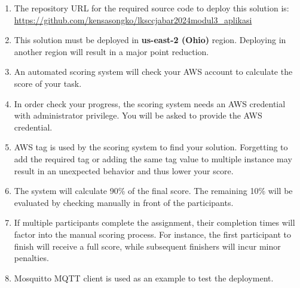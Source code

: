 \documentclass{article}
\begin{document}
\begin{enumerate}
  \item The repository URL for the required source code to deploy this solution is:\\
  \href{https://github.com/kensasongko/lksccjabar2024modul3_aplikasi}{https://github.com/kensasongko/lksccjabar2024modul3\_aplikasi}
  \item This solution must be deployed in \textbf{us-east-2 (Ohio)} region. Deploying in another region will result in a major point reduction.
  \item An automated scoring system will check your AWS account to calculate the score of your task.
  \item In order check your progress, the scoring system needs an AWS credential with administrator privilege. You will be asked to provide the AWS credential.
  \item AWS tag is used by the scoring system to find your solution. Forgetting to add the required tag or adding the same tag value to multiple instance may result in an unexpected behavior and thus lower your score.
  \item The system will calculate 90\% of the final score. The remaining 10\% will be evaluated by checking manually in front of the participants.
  \item If multiple participants complete the assignment, their completion times will factor into the manual scoring process. For instance, the first participant to finish will receive a full score, while subsequent finishers will incur minor penalties.
  \item Mosquitto MQTT client is used as an example to test the deployment.
\end{enumerate}
\end{document}
